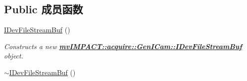 \subsection*{Public 成员函数}
\begin{DoxyCompactItemize}
\item 
\hypertarget{classmv_i_m_p_a_c_t_1_1acquire_1_1_gen_i_cam_1_1_i_dev_file_stream_buf_a17357fc5b1015fe5c851cdcf07ade0bf}{\hyperlink{classmv_i_m_p_a_c_t_1_1acquire_1_1_gen_i_cam_1_1_i_dev_file_stream_buf_a17357fc5b1015fe5c851cdcf07ade0bf}{I\+Dev\+File\+Stream\+Buf} ()}\label{classmv_i_m_p_a_c_t_1_1acquire_1_1_gen_i_cam_1_1_i_dev_file_stream_buf_a17357fc5b1015fe5c851cdcf07ade0bf}

\begin{DoxyCompactList}\small\item\em Constructs a new {\bfseries \hyperlink{classmv_i_m_p_a_c_t_1_1acquire_1_1_gen_i_cam_1_1_i_dev_file_stream_buf}{mv\+I\+M\+P\+A\+C\+T\+::acquire\+::\+Gen\+I\+Cam\+::\+I\+Dev\+File\+Stream\+Buf}} object. \end{DoxyCompactList}\item 
\hypertarget{classmv_i_m_p_a_c_t_1_1acquire_1_1_gen_i_cam_1_1_i_dev_file_stream_buf_aadb6c054750ff6390f13d5df7241ef8e}{\hyperlink{classmv_i_m_p_a_c_t_1_1acquire_1_1_gen_i_cam_1_1_i_dev_file_stream_buf_aadb6c054750ff6390f13d5df7241ef8e}{$\sim$\+I\+Dev\+File\+Stream\+Buf} ()}\label{classmv_i_m_p_a_c_t_1_1acquire_1_1_gen_i_cam_1_1_i_dev_file_stream_buf_aadb6c054750ff6390f13d5df7241ef8e}


\end{DoxyCompactItemize}
